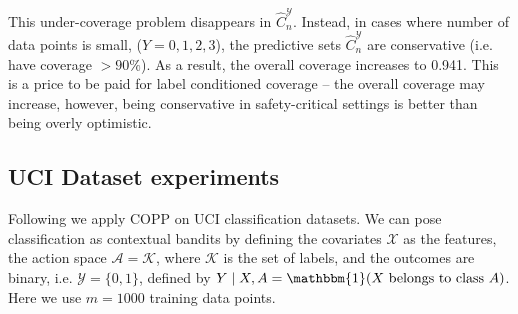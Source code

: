 This under-coverage problem disappears in $\hat{C}^{\mathcal{Y}}_n$. Instead, in cases where number of data points is small, ($Y = 0,1,2,3$), the predictive sets $\hat{C}^{\mathcal{Y}}_n$ are conservative (i.e. have coverage $> 90\%$). As a result, the overall coverage increases to 0.941. This is a price to be paid for label conditioned coverage -- the overall coverage may increase, however, being conservative in safety-critical settings is better than being overly optimistic.

\begin{table}[t]
\begin{center}
\caption{Coverages for COPP with and without label conditioned coverage, $\hat{C}^{\mathcal{Y}}_n$ and $\hat{C}_n$ respectively. Overall coverage refers to marginal coverage while $Y=y$ refers to coverage conditioned on $Y=y$. Here $n_{test}$ corresponds to the number of test data points ($\sim P^{\pi^*}$).}
\label{tab:label-cond}
\end{center}
\end{table}

\subsection{UCI Dataset experiments}\label{sec:UCI}
Following \cite{risk-assessment, doubly-robust, adaptive-ope} we apply COPP on UCI classification datasets. We can pose classification as contextual bandits by defining the covariates $\mathcal{X}$ as the features, the action space $\mathcal{A} =\mathcal{K}$, where $\mathcal{K}$ is the set of labels, and the outcomes are binary, i.e. $\mathcal{Y}= \{0,1\}$, defined by $Y \mid X, A = \mathbbm{1}(X \textup{ belongs to class }A)$. Here we use $m=1000$ training data points.

